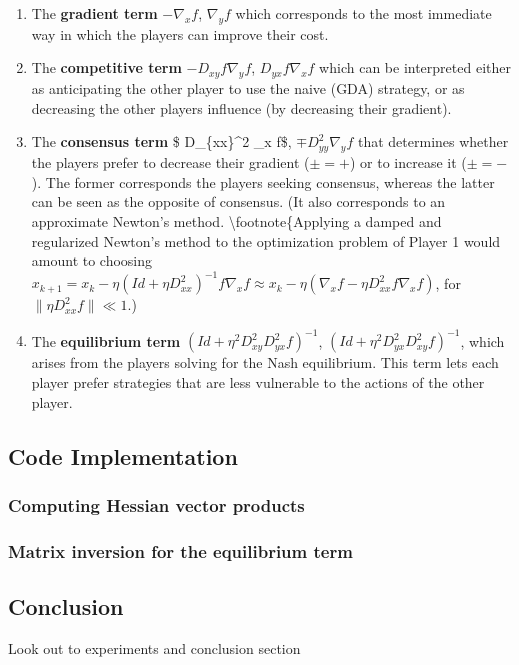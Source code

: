 \documentclass[11pt]{article}
\begin{document}
\begin{enumerate}
\def\labelenumi{\arabic{enumi}.}
\item
  The \textbf{gradient term} \(-\nabla_{x}f\), \(\nabla_{y}f\) which
  corresponds to the most immediate way in which the players can improve
  their cost.
\item
  The \textbf{competitive term} \(-D_{xy}f \nabla_yf\),
  \(D_{yx}f \nabla_x f\) which can be interpreted either as anticipating
  the other player to use the naive (GDA) strategy, or as decreasing the
  other players influence (by decreasing their gradient).
\item
  The \textbf{consensus term} \$ \pm D\_\{xx\}\^{}2 \nabla\_x f\$,
  \(\mp D_{yy}^2 \nabla_y f\) that determines whether the players prefer
  to decrease their gradient (\(\pm = +\)) or to increase it
  (\(\pm = -\)). The former corresponds the players seeking consensus,
  whereas the latter can be seen as the opposite of consensus. (It also
  corresponds to an approximate Newton's method.
  \textbackslash{}footnote\{Applying a damped and regularized Newton's
  method to the optimization problem of Player 1 would amount to
  choosing
  \(x_{k+1} = x_{k} - \eta(Id + \eta D_{xx}^2)^{-1} f \nabla_x f \approx x_{k} - \eta( \nabla_xf - \eta D_{xx}^{2}f \nabla_x f)\),
  for \(\|\eta D_{xx}^2f\| \ll 1\).)
\item
  The \textbf{equilibrium term}
  \((Id + \eta^2 D_{xy}^2 D_{yx}^2 f)^{-1}\),
  \((Id + \eta^2 D_{yx}^2 D_{xy}^2 f)^{-1}\), which arises from the
  players solving for the Nash equilibrium. This term lets each player
  prefer strategies that are less vulnerable to the actions of the other
  player.
\end{enumerate}

    \subsection{Code Implementation}\label{code-implementation}

\subsubsection{Computing Hessian vector
products}\label{computing-hessian-vector-products}

\subsubsection{Matrix inversion for the equilibrium
term}\label{matrix-inversion-for-the-equilibrium-term}

    \subsection{Conclusion}\label{conclusion}

Look out to experiments and conclusion section


    
    
    
    
\end{document}
